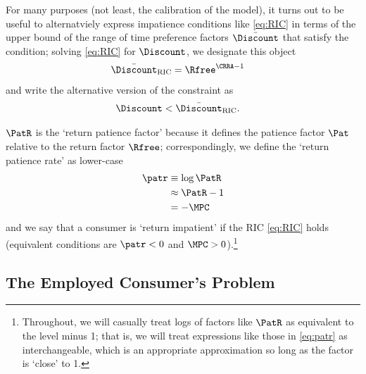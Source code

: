 \documentclass{\handout}
\begin{document}
For many purposes (not least, the calibration of the model), it turns out to be useful to alternatviely express
impatience conditions like \eqref{eq:RIC} in terms of the upper bound of the range of time preference
factors $\bar{\Discount}$ that satisfy the condition; solving \eqref{eq:RIC} for $\Discount$, we designate this 
object \providecommand{\DiscountMaxRIC}{\ensuremath{\bar{\Discount}_{\text{RIC}}}}
\begin{equation}\begin{gathered}\begin{aligned}
  \DiscountMaxRIC & =  \Rfree^{\CRRA-1}
\end{aligned}\end{gathered}\end{equation}
and write the alternative version of the constraint as 
\begin{equation}\begin{gathered}\begin{aligned}
  \Discount & <  \DiscountMaxRIC \label{eq:DiscountMaxRIC}.
\end{aligned}\end{gathered}\end{equation}

$\PatR$ is the `return patience factor' because it defines the patience factor $\Pat$
relative to the return factor $\Rfree$; correspondingly, we define the `return
patience rate' as lower-case
\begin{equation}\begin{gathered}\begin{aligned}
   \patr & \equiv   \log \PatR \label{eq:patr}
\\ & \approx \PatR - 1 
\\ & =  -\MPCU
\end{aligned}\end{gathered}\end{equation}
and we say that a consumer is `return impatient' if the RIC \eqref{eq:RIC} holds (equivalent conditions are $\patr < 0$ and $\MPCU > 0$).\footnote{Throughout, we will casually treat logs of factors like $\PatR$ as equivalent to the level minus 1; that is, we will treat expressions like those in \eqref{eq:patr} as interchangeable, which is an appropriate approximation so long as the factor is `close' to 1.}

\subsection{The Employed Consumer's Problem}
\end{document}

